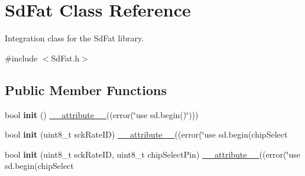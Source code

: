 \hypertarget{class_sd_fat}{\section{Sd\-Fat Class Reference}
\label{class_sd_fat}
}


Integration class for the Sd\-Fat library.  




{\ttfamily \#include $<$Sd\-Fat.\-h$>$}

\subsection*{Public Member Functions}
\begin{DoxyCompactItemize}
\item 
\hypertarget{class_sd_fat_a0a78869d5eb1c6c3149211e2a8704091}{bool {\bfseries init} () \hyperlink{group__digital_pin_ga5589cd85aa7f8bf2b29ba1541eeb7103}{\-\_\-\-\_\-attribute\-\_\-\-\_\-}((error(\char`\"{}use sd.\-begin()\char`\"{})))}\label{class_sd_fat_a0a78869d5eb1c6c3149211e2a8704091}

\item 
\hypertarget{class_sd_fat_a0b87bf60c37b88ad062309a1d8f189fc}{bool {\bfseries init} (uint8\-\_\-t sck\-Rate\-I\-D) \hyperlink{group__digital_pin_ga5589cd85aa7f8bf2b29ba1541eeb7103}{\-\_\-\-\_\-attribute\-\_\-\-\_\-}((error(\char`\"{}use sd.\-begin(chip\-Select}\label{class_sd_fat_a0b87bf60c37b88ad062309a1d8f189fc}

\item 
\hypertarget{class_sd_fat_a8b641d5285542fe6d41f70a702d3c2ad}{bool {\bfseries init} (uint8\-\_\-t sck\-Rate\-I\-D, uint8\-\_\-t chip\-Select\-Pin) \hyperlink{group__digital_pin_ga5589cd85aa7f8bf2b29ba1541eeb7103}{\-\_\-\-\_\-attribute\-\_\-\-\_\-}((error(\char`\"{}use sd.\-begin(chip\-Select}\label{class_sd_fat_a8b641d5285542fe6d41f70a702d3c2ad}


\end{DoxyCompactItemize}

